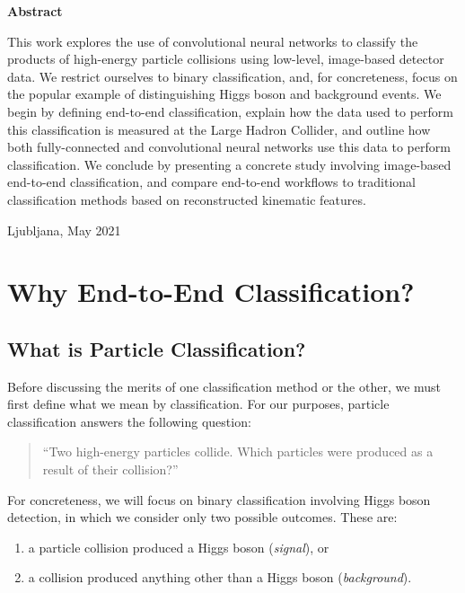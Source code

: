 \documentclass[11pt, a4paper]{article}
\begin{document}
\vspace{10mm}
\begin{center}
    \textbf{Abstract}\\[2mm]
    \begin{minipage}[t]{0.85\textwidth}
        This work explores the use of convolutional neural networks to classify the products of high-energy particle collisions using low-level, image-based detector data. We restrict ourselves to binary classification, and, for concreteness, focus on the popular example of distinguishing Higgs boson and background events. We begin by defining end-to-end classification, explain how the data used to perform this classification is measured at the Large Hadron Collider, and outline how both fully-connected and convolutional neural networks use this data to perform classification. We conclude by presenting a concrete study involving image-based end-to-end classification, and compare end-to-end workflows to traditional classification methods based on reconstructed kinematic features.
    \end{minipage}

    \vspace{10mm}
    \large{Ljubljana, May 2021}
\end{center}

\newpage
\thispagestyle{empty}
\tableofcontents
\newpage

\section{Why End-to-End Classification?}
\subsection{What is Particle Classification?}
Before discussing the merits of one classification method or the other, we must first define what we mean by classification.
For our purposes, particle classification answers the following question:
\begin{quote}
    ``Two high-energy particles collide.
    Which particles were produced as a result of their collision?''
\end{quote}
    For concreteness, we will focus on binary classification involving Higgs boson detection, in which we consider only two possible outcomes.
    These are:
\begin{enumerate}

    \item a particle collision produced a Higgs boson (\textit{signal}), or

    \item a collision produced anything other than a Higgs boson (\textit{background}).

\end{enumerate}
\end{document}
